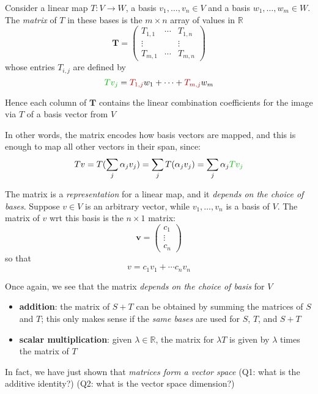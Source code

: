 
Consider a linear map $T:V \to W$, a basis $v_1,\dots,v_n \in V$ and a basis $w_1,\dots,w_m\in W$.
{
The \emph{matrix} of $T$ in these bases is the $m\times n$ array of values in $\mathbb{R}$
%
\[
\mathbf{T} = \begin{pmatrix}
    T_{1,1} & \cdots & T_{1,n} \\
    \vdots & & \vdots\\
    T_{m,1} & \cdots & T_{m,n}
  \end{pmatrix}
\]
%
whose entries $T_{i,j}$ are defined by
%
\[
{\color{darkgreen}Tv_j} = {\color{red}T_{1,j}} w_1 + \cdots + {\color{red}T_{m,j}} w_m
\]
}%

{
Hence each column of $\mathbf{T}$ contains the {\color{red}linear combination coefficients} for the {\color{darkgreen}image via $T$ of a basis vector from $V$}
}

{
In other words, the matrix encodes {\color{darkgreen}how basis vectors are mapped}, and this is enough to map all other vectors in their span, since:
\[ Tv = T ( \sum_j \alpha_j v_j ) = \sum_j T(\alpha_j v_j) = \sum_j \alpha_j {\color{darkgreen}Tv_j} \]
}

The matrix is a \emph{representation} for a linear map, and it \emph{depends on the choice of bases}.
Suppose $v \in V$ is an arbitrary vector, while $v_1,\dots,v_n$ is a basis of $V$. The matrix of $v$ wrt this basis is the $n\times 1$ matrix:
%
\[
\mathbf{v} = \begin{pmatrix}
    c_1 \\
    \vdots\\
    c_n
  \end{pmatrix}
\]
%
so that
%
\[
v = c_1 v_1 + \cdots c_n v_n
\]

Once again, we see that the matrix \emph{depends on the choice of basis} for $V$


\begin{itemize}
\item \textbf{addition}:  the matrix of $S+T$ can be obtained by summing the matrices of $S$ and $T${; this only makes sense if the \emph{same bases} are used for $S$, $T$, and $S+T$}
\item \textbf{scalar multiplication}: given $\lambda\in\mathbb{R}$, the matrix for $\lambda T$ is given by $\lambda$ times the matrix of $T$
\end{itemize}

{
In fact, we have just shown that \emph{matrices form a vector space} (Q1: what is the additive identity?) {(Q2: what is the vector space dimension?)}
}

